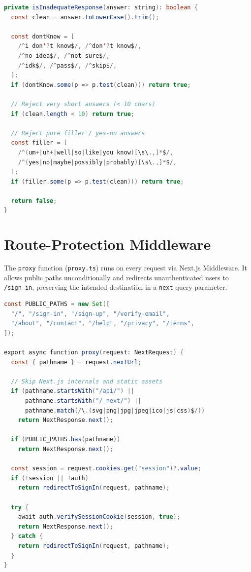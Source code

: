 \begin{lstlisting}[language=Java,
  caption={Inadequate response detection
           (\texttt{lib/realTimeAnalysis.ts})},
  label={lst:inadequate}]
private isInadequateResponse(answer: string): boolean {
  const clean = answer.toLowerCase().trim();

  const dontKnow = [
    /^i don'?t know$/, /^don'?t know$/,
    /^no idea$/, /^not sure$/,
    /^idk$/, /^pass$/, /^skip$/,
  ];
  if (dontKnow.some(p => p.test(clean))) return true;

  // Reject very short answers (< 10 chars)
  if (clean.length < 10) return true;

  // Reject pure filler / yes-no answers
  const filler = [
    /^(um+|uh+|well|so|like|you know)[\s\.,]*$/,
    /^(yes|no|maybe|possibly|probably)[\s\.,]*$/,
  ];
  if (filler.some(p => p.test(clean))) return true;

  return false;
}
\end{lstlisting}

\section{Route-Protection Middleware}
\label{app:middleware}

The \texttt{proxy} function (\texttt{proxy.ts}) runs on every request via
Next.js Middleware.  It allows public paths unconditionally and redirects
unauthenticated users to \texttt{/sign-in}, preserving the intended destination
in a \texttt{next} query parameter.

\begin{lstlisting}[language=Java,
  caption={Route-protection middleware (\texttt{proxy.ts})},
  label={lst:middleware}]
const PUBLIC_PATHS = new Set([
  "/", "/sign-in", "/sign-up", "/verify-email",
  "/about", "/contact", "/help", "/privacy", "/terms",
]);

export async function proxy(request: NextRequest) {
  const { pathname } = request.nextUrl;

  // Skip Next.js internals and static assets
  if (pathname.startsWith("/api/") ||
      pathname.startsWith("/_next/") ||
      pathname.match(/\.(svg|png|jpg|jpeg|ico|js|css)$/))
    return NextResponse.next();

  if (PUBLIC_PATHS.has(pathname))
    return NextResponse.next();

  const session = request.cookies.get("session")?.value;
  if (!session || !auth)
    return redirectToSignIn(request, pathname);

  try {
    await auth.verifySessionCookie(session, true);
    return NextResponse.next();
  } catch {
    return redirectToSignIn(request, pathname);
  }
}
\end{lstlisting}
